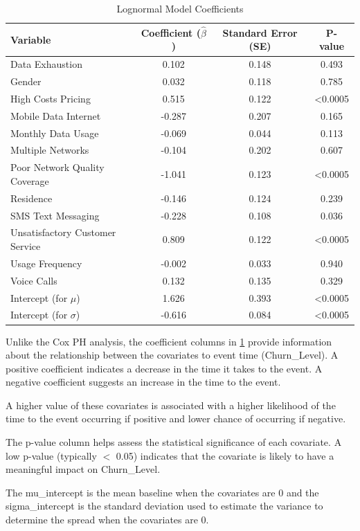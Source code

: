 \documentclass[doublespacing]{report} [12px]%
\begin{document}
\begin{table}[H]
\centering
\begin{tabular}{lccc}
\toprule
Variable & Coefficient ($\hat{\beta}$) & Standard Error (SE) & P-value\\
\midrule
Data Exhaustion& 0.102 & 0.148 & 0.493 \\
Gender & 0.032 & 0.118 & 0.785 \\
High Costs Pricing & 0.515 & 0.122 & <0.0005 \\
Mobile Data Internet & -0.287 & 0.207 & 0.165 \\
Monthly Data Usage & -0.069 & 0.044 & 0.113 \\
Multiple Networks & -0.104 & 0.202 & 0.607 \\
Poor Network Quality Coverage & -1.041 & 0.123 & <0.0005 \\
Residence & -0.146 & 0.124 & 0.239 \\
SMS Text Messaging & -0.228 & 0.108 & 0.036 \\
Unsatisfactory Customer Service & 0.809 & 0.122 & <0.0005 \\
Usage Frequency & -0.002 & 0.033 & 0.940 \\
Voice Calls & 0.132 & 0.135 & 0.329 \\
Intercept (for $\mu$) & 1.626 & 0.393 & <0.0005 \\
Intercept (for $\sigma$) & -0.616 & 0.084 & <0.0005 \\
\bottomrule
\end{tabular}
\caption{Lognormal Model Coefficients}
\label{table:lognormal_coefficients}
\end{table}

Unlike the Cox PH analysis, the coefficient columns in \ref{table:lognormal_coefficients} provide information about the relationship between the covariates to event time (Churn\_Level). A positive coefficient indicates a decrease in the time it takes to the event. A negative coefficient suggests an increase in the time to the event. 

 A higher value of these covariates is associated with a higher  likelihood of the time to the event occurring if positive and lower chance of occurring if negative.
 
The p-value column helps assess the statistical significance of each covariate. A low p-value (typically  \(< \) 0.05) indicates that the covariate is likely to have a meaningful impact on Churn\_Level. 

The mu\_intercept is the mean baseline when the covariates are 0 and the sigma\_intercept is the standard deviation used to estimate the variance to determine the spread when the covariates are 0.
\end{document}
